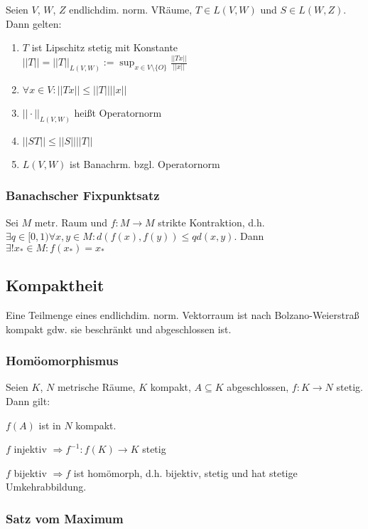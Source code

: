 Seien $V$, $W$, $Z$ endlichdim. norm. VRäume, $T \in L(V, W)$ und $S \in L(W, Z)$. Dann gelten:

\begin{enumerate}[label=(\alph*)]
	\item $T$ ist Lipschitz stetig mit Konstante \\ $||T|| = ||T||_{L(V, W)} := \sup_{x\in V \setminus \{O\}} \frac{||Tx||}{||x||}$
	\item $\forall x \in V : ||Tx|| \leq ||T|| ||x||$
	\item $||\cdot||_{L(V,W)}$ heißt Operatornorm
	\item $||ST|| \leq ||S|| ||T||$
	\item $L(V, W)$ ist Banachrm. bzgl. Operatornorm
\end{enumerate}

\subsubsection*{Banachscher Fixpunktsatz}

Sei $M$ metr. Raum und $f : M \rightarrow M$ strikte Kontraktion, d.h. $\exists q \in [0, 1) \forall x,y \in M : d(f(x), f(y)) \leq q d(x,y)$. Dann $\exists! x_* \in M : f(x_*) = x_*$

\subsection*{Kompaktheit}

Eine Teilmenge eines endlichdim. norm. Vektorraum ist nach Bolzano-Weierstraß kompakt gdw. sie beschränkt und abgeschlossen ist.

\subsubsection*{Homöomorphismus}

Seien $K$, $N$ metrische Räume, $K$ kompakt, $A \subseteq K$ abgeschlossen, $f: K \rightarrow N$ stetig. Dann gilt:

$f(A)$ ist in $N$ kompakt.

$f$ injektiv $\Rightarrow f^{-1} : f(K) \rightarrow K$ stetig

$f$ bijektiv $\Rightarrow f$ ist homömorph, d.h. bijektiv, stetig und hat stetige Umkehrabbildung.

\subsubsection*{Satz vom Maximum}

